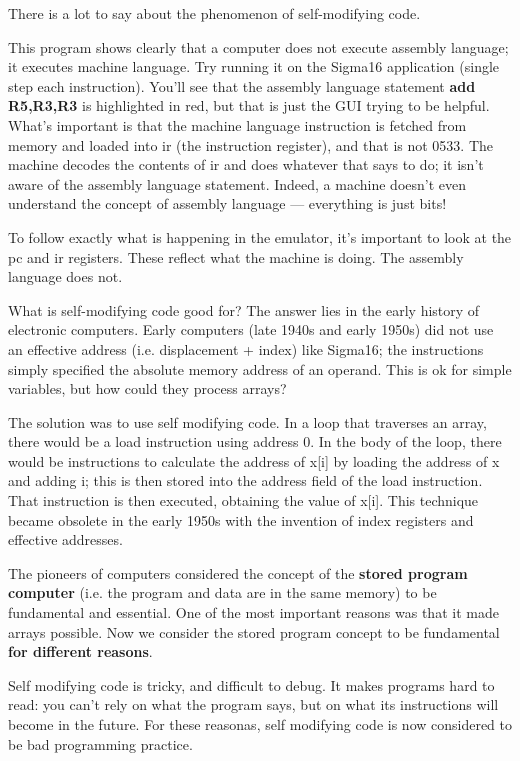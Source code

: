 \documentclass[11pt]{article}
\begin{document}
\begin{itemize}
There is a lot to say about the phenomenon of self-modifying code.

This program shows clearly that a computer does not execute assembly
language; it executes machine language.  Try running it on the Sigma16
application (single step each instruction).  You'll see that the
assembly language statement \textbf{add R5,R3,R3} is highlighted in red, but
that is just the GUI trying to be helpful.  What's important is that
the machine language instruction is fetched from memory and loaded
into ir (the instruction register), and that is not 0533.  The machine
decodes the contents of ir and does whatever that says to do; it isn't
aware of the assembly language statement.  Indeed, a machine doesn't
even understand the concept of assembly language --- everything is
just bits!

To follow exactly what is happening in the emulator, it's important to
look at the pc and ir registers.  These reflect what the machine is
doing.  The assembly language does not.

What is self-modifying code good for?  The answer lies in the early
history of electronic computers.  Early computers (late 1940s and
early 1950s) did not use an effective address (i.e.  displacement +
index) like Sigma16; the instructions simply specified the absolute
memory address of an operand.  This is ok for simple variables, but
how could they process arrays?

The solution was to use self modifying code.  In a loop that traverses
an array, there would be a load instruction using address 0.  In the
body of the loop, there would be instructions to calculate the address
of x[i] by loading the address of x and adding i; this is then stored
into the address field of the load instruction.  That instruction is
then executed, obtaining the value of x[i].  This technique became
obsolete in the early 1950s with the invention of index registers and
effective addresses.

The pioneers of computers considered the concept of the \textbf{stored
program computer} (i.e. the program and data are in the same memory)
to be fundamental and essential.  One of the most important reasons
was that it made arrays possible.  Now we consider the stored program
concept to be fundamental \textbf{for different reasons}.

Self modifying code is tricky, and difficult to debug.  It makes
programs hard to read: you can't rely on what the program says, but on
what its instructions will become in the future.  For these reasonas,
self modifying code is now considered to be bad programming practice.


\end{itemize}
\end{document}
